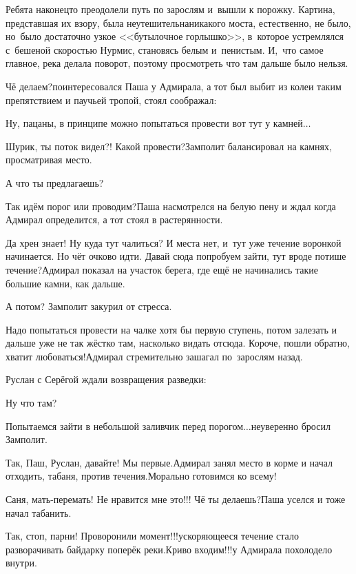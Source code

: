 Ребята наконец\sdash то преодолели путь по зарослям и~вышли к порожку. Картина, представшая их взору, была неутешительна\mdash никакого моста, естественно, не было, но~было достаточно узкое <<бутылочное горлышко>>, в~которое устремлялся с~бешеной скоростью Нурмис, становясь белым и~пенистым. И,~что самое главное, река делала поворот, поэтому просмотреть что там дальше было нельзя. 

\diagdash Чё делаем?\mdash поинтересовался Паша у Адмирала, а тот был выбит из колеи таким препятствием и паучьей тропой, стоял соображал:

\diagdash Ну, пацаны, в принципе можно попытаться провести вот тут у камней$\ldots$

\diagdash Шурик, ты поток видел?! Какой провести?\mdash Замполит балансировал на камнях, просматривая место.

\diagdash А что ты предлагаешь?

\diagdash Так идём порог или проводим?\mdash Паша насмотрелся на белую пену и ждал когда Адмирал определится, а тот стоял в растерянности. 

\diagdash Да хрен знает! Ну куда тут чалиться? И места нет, и~тут уже течение воронкой начинается. Но чёт очково идти. Давай сюда попробуем зайти, тут вроде потише течение?\mdash Адмирал показал на участок берега, где ещё не начинались такие большие камни, как дальше. 

\diagdash А потом? \mdash Замполит закурил от стресса.

\diagdash Надо попытаться провести на чалке хотя бы первую ступень, потом залезать и дальше уже не так жёстко там, насколько видать отсюда. Короче, пошли обратно, хватит любоваться!\mdash Адмирал стремительно зашагал по~зарослям назад.

Руслан с Серёгой ждали возвращения разведки:

\diagdash Ну что там?

\diagdash Попытаемся зайти в небольшой заливчик перед порогом$\ldots$\mdash неуверенно бросил Замполит.

\diagdash Так, Паш, Руслан, давайте! Мы первые.\mdash Адмирал занял место в корме и начал отходить, табаня, против течения.\mdash Морально готовимся ко всему!

\diagdash Саня, мать-перемать! Не нравится мне это!!! Чё ты делаешь?\mdash Паша уселся и тоже начал табанить.

\diagdash Так, стоп, парни! Проворонили момент!!!\mdash ускоряющееся течение стало разворачивать байдарку поперёк реки.\mdash Криво входим!!!\mdash у Адмирала похолодело внутри.

